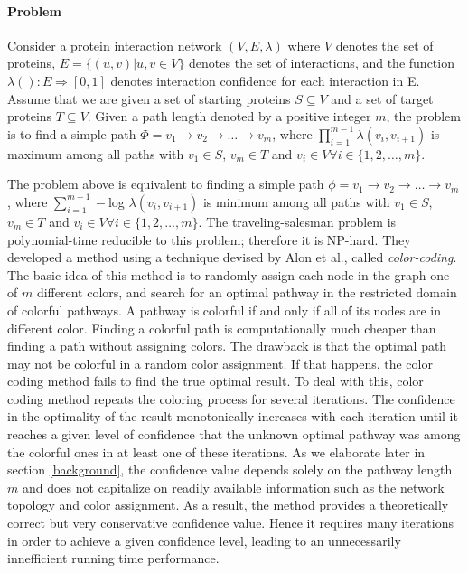 \documentclass{ws-procs11x85}
\begin{document}
\paragraph{Problem} Consider a protein interaction network $(V, E, \lambda)$ where
$V$ denotes the set of proteins, $E = \{(u, v) | u,v \in V\}$ denotes the set of
interactions, and the function $\lambda(): E \Rightarrow [0, 1]$  denotes interaction
confidence for each interaction in E. Assume that we are given a set of starting
proteins $S \subseteq V$ and a set of target proteins $T \subseteq V$. Given a
path length denoted by a positive integer $m$, the problem is to find a simple
path $\Phi = v_1 \rightarrow v_2 \rightarrow \ldots \rightarrow v_m$, where
$\prod_{i=1}^{m-1} \lambda(v_i, v_{i+1})$ is maximum among all paths with $v_1 \in
S$, $v_m \in T$ and $v_i \in V \forall i \in \{1, 2, \ldots , m\}$.

The problem above is equivalent to finding a simple path $\phi = v_1 \rightarrow
v_2 \rightarrow \ldots \rightarrow v_m$, where $\sum_{i=1}^{m-1} -$log
$\lambda(v_i, v_{i+1})$ is minimum among all paths with $v_1 \in
S$, $v_m \in T$ and $v_i \in V \forall i \in \{1, 2, \ldots , m\}$. The
traveling-salesman problem is polynomial-time reducible to this
problem\cite{scott}; therefore it is NP-hard. They developed a method using a
technique devised by Alon et al.\cite{alon}, called \textit{color-coding}. The
basic idea of this method is to randomly assign each node in the graph one of
$m$ different colors, and search for an optimal pathway in the restricted
domain of colorful pathways. A pathway is colorful if and only if all of its
nodes are in different color. Finding a colorful path is computationally much
cheaper than finding a path without assigning colors. The drawback is that the
optimal path may not be colorful in a random color assignment. If that happens,
the color coding method fails to find the true optimal result. To deal with
this, color coding method repeats the coloring process for several iterations.
The confidence in the optimality of the result monotonically increases with each
iteration until it reaches a given level of confidence that the unknown optimal
pathway was among the colorful ones in at least one of these iterations. As we
elaborate later in section \ref{background}, the confidence value depends
solely on the pathway length $m$ and does not capitalize on readily available
information such as the network topology and color assignment. As a result, the
method provides a theoretically correct but very conservative confidence value.
Hence it requires many iterations in order to achieve a given confidence level,
leading to an unnecessarily innefficient running time performance.
\end{document}
